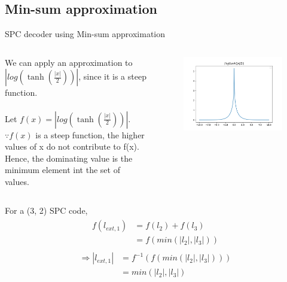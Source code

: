 \subsection{Min-sum approximation}
\begin{frame}{SPC decoder using Min-sum approximation}
\begin{columns}[T,onlytextwidth]
We can apply an approximation to $\left|log \left(\tanh \left (\frac{|x|}{2}\right)\right)\right|$, since it is a steep function.\\~\\
Let $f(x) = \left|log \left(\tanh \left (\frac{|x|}{2}\right)\right)\right|$. \\
$\because f(x)$ is a steep function, the higher values of x do not contribute to f(x). Hence, the dominating value is the minimum element int the set of values.

\begin{figure}
			\includegraphics[width=\textwidth]{AWGN/logtanh.png}
		\end{figure}
\end{columns}
For a (3, 2) SPC code, 
\begin{gather*}
    \begin{split}
    f(l_{ext, 1}) & = f(l_2) + f(l_3) \\
    & = f(min(|l_2|, |l_3|))
    \end{split}
\end{gather*}
\begin{gather*}
    \begin{split}
    \Rightarrow |l_{ext, 1}| & = f^{-1}(f(min(|l_2|, |l_3|))) \\
    & = min(|l_2|, |l_3|)
    \end{split}
\end{gather*}
\end{frame}

